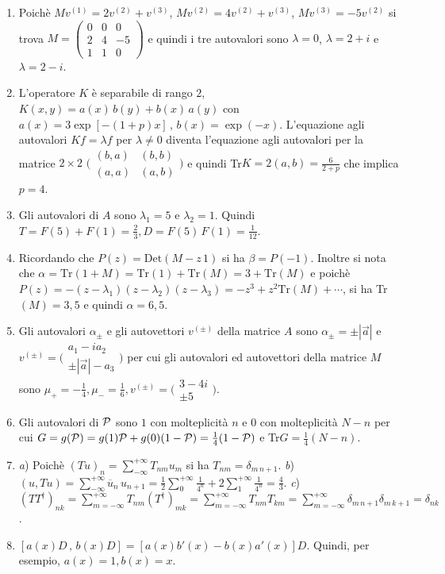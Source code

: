\documentclass[a4paper,10pt]{article}
\begin{document}
\begin{enumerate}
\item Poich\`e $M v^{(1)}= 2 v^{(2)} + v^{(3)}$, $M v^{(2)}= 4 v^{(2)} + v^{(3)}$, $M v^{(3)}= -5 v^{(2)}$ si trova $M=\begin{pmatrix} 0 & 0 & 0 \\ 2 & 4 & -5 \\ 1 & 1 & 0 \end{pmatrix}$ e quindi i tre autovalori sono $\lambda=0$, $\lambda=2+i$ e $\lambda=2-i$.
\item L'operatore $K$ \`e separabile di rango $2$, $K(x,y)=a(x)\,b(y)+b(x)\,a(y)$ con $a(x)=3\exp[-(1+p)x]\,,\,b(x)=\exp(-x)$. L'equazione agli autovalori $Kf=\lambda f$ per $\lambda\neq 0$ diventa l'equazione agli autovalori per la matrice $2\times 2$ $\bigl( \begin{smallmatrix} (b,a)&(b,b)\\(a,a)&(a,b)\end{smallmatrix}\bigr)$ e quindi Tr$K=2(a,b)=\frac{6}{2+p}$ che implica $p=4$.
\item Gli autovalori di $A$ sono $\lambda_1=5$ e  $\lambda_2=1$. Quindi $T=F(5) + F(1)= \frac23, D=F(5)\,F(1)=\frac{1}{12}$.
\item  Ricordando che $P(z)=\text{Det}(M-z\,1)$ si ha $\beta = P(-1)$. Inoltre si nota che $\alpha = \text{Tr}(1+M)=\text{Tr}(1) + \text{Tr}(M) = 3+ \text{Tr}(M)$ e poich\`e $P(z)= -(z-\lambda_1)(z-\lambda_2)(z-\lambda_3)=-z^3+z^2 \text{Tr}(M) + \cdots$, si ha Tr$(M)=3,5$ e quindi $\alpha= 6,5$.
\item Gli autovalori $\alpha_{\pm}$ e gli autovettori $v^{(\pm)}$ della
matrice $A$ sono $\alpha_{\pm}=\pm |\vec {a}|$ e $v^{(\pm)}=\bigl(\begin{smallmatrix}a_1-ia_2\\ \pm |\vec{a}|-a_3\end{smallmatrix}\bigr)$ per cui gli autovalori ed autovettori della matrice $M$ sono $\mu_{+} = -\frac14, \mu_{-}=\frac16, v^{(\pm)}=\bigl(\begin{smallmatrix}3-4i\\ \pm 5 \end{smallmatrix}\bigr)$.
\item Gli autovalori di ${\cal P}$ sono $1$ con molteplicit\`a $n$ e $0$ con molteplicit\`a $N-n$ per cui $G=g({\cal P})= g(1) {\cal P} + g(0)(1-{\cal P})= \frac14(1-{\cal P})$ e Tr$G=\frac14(N-n)$.
\item {\it a}) Poich\`e $(Tu)_n= \sum_{-\infty}^{+\infty} T_{nm} u_m$ si ha $T_{nm}=\delta_{m\,n+1}$. {\it b}) $(u,Tu)=\sum_{-\infty}^{+\infty}\overline{u}_n \,u_{n+1}=\frac12 \sum_{0}^{+\infty} \frac{1}{4^n} +2  \sum_{1}^{+\infty} \frac{1}{4^n}=\frac43 $. {\it c}) $(TT^{\dag})_{nk}= \sum_{m=-\infty}^{+\infty} T_{nm} (T^{\dag})_{mk}= \sum_{m=-\infty}^{+\infty} T_{nm} T_{km}= \sum_{m=-\infty}^{+\infty} \delta _{m\,n+1} \delta_{m\,k+1}=\delta_{nk}$.
\item $[a(x) D\,,\,b(x) D]=[a(x)b'(x)-b(x) a'(x)] D$. Quindi, per esempio, $a(x)=1, b(x)=x$.
\end{enumerate}
\end{document}
